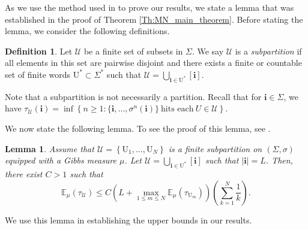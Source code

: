 \documentclass[11pt, reqno]{amsart}
\theoremstyle{plain}%
\newtheorem{lemma}[theorem]{Lemma}
\theoremstyle{definition}
\newtheorem{definition}[theorem]{Definition}
\theoremstyle{definition}
\def\U{\ensuremath{\mathcal U}}
\def\E{\mathbb E}
\def\st{such that }
\numberwithin{equation}{section}
\begin{document}
As we use the method used in \cite[Section 5]{MikeNatali} to prove our results, we state a lemma that was established in the proof of Theorem \ref{Th:MN_main_theorem}. Before stating the lemma, we consider the following definitions.


\begin{definition}
Let $\mathcal{U}$ be a finite set of subsets in $\Sigma$. We say $\mathcal{U}$ is a \emph{subpartition} if all elements in this set are pairwise disjoint and there exists a finite or countable set of finite words $\mathrm{U}^*\subset\Sigma^*$ \st $\mathcal{U}=\bigcup_{\mathbf{i}\in \mathrm{U}^*}[\textbf{i}]$.
\end{definition}
Note that a subpartition is not necessarily a partition. Recall that for $\textbf{i}\in \Sigma$, we have $\tau_{\mathcal{U}}(\textbf{i})=\inf\left\{n\ge 1:  \{\textbf{i},\ldots,\sigma^n(\textbf{i})\}  \ \text{hits each}\ U\in \mathcal{U}\right\}$.

We now state the following lemma. To see the proof of this lemma, see \cite[Proof of Theorem 2.2]{MikeNatali}.

\begin{lemma}\label{Lemma:subpartition}
    Assume that $\mathcal{U}=\left\{ \mathrm{U}_1, \ldots,\mathrm{U}_N \right\}$ is a finite subpartition on $\left(\Sigma,\sigma\right)$ equipped with a Gibbs measure $\mu$. Let $\mathcal{U}=\bigcup_{\mathbf{i}\in \mathrm{U}^*}[\mathbf{i}]$ \st $|\mathbf{i}|=L$. Then, there exist $C>1$ \st
    $$  \E_\mu(\tau_\mathcal{U})\le C\left(L+\max_{1\le m\le N}\E_\mu(\tau_{\mathrm{U}_m})\right)\left( \sum_{k=1}^N\frac{1}{k}\right).$$
\end{lemma}

We use this lemma in establishing the upper bounds in our results. 


\end{document}
